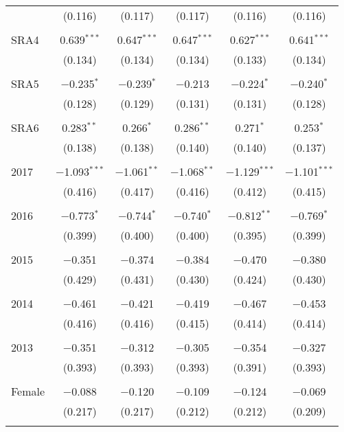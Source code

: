 \begin{table}[H]
\begin{adjustbox}{width=\textwidth, totalheight=\baselineskip}
\begin{tabular}{@{\extracolsep{5pt}}lccccc}
  & (0.116) & (0.117) & (0.117) & (0.116) & (0.116) \\ 
  & & & & & \\ 
 SRA4 & 0.639$^{***}$ & 0.647$^{***}$ & 0.647$^{***}$ & 0.627$^{***}$ & 0.641$^{***}$ \\ 
  & (0.134) & (0.134) & (0.134) & (0.133) & (0.134) \\ 
  & & & & & \\ 
 SRA5 & $-$0.235$^{*}$ & $-$0.239$^{*}$ & $-$0.213 & $-$0.224$^{*}$ & $-$0.240$^{*}$ \\ 
  & (0.128) & (0.129) & (0.131) & (0.131) & (0.128) \\ 
  & & & & & \\ 
 SRA6 & 0.283$^{**}$ & 0.266$^{*}$ & 0.286$^{**}$ & 0.271$^{*}$ & 0.253$^{*}$ \\ 
  & (0.138) & (0.138) & (0.140) & (0.140) & (0.137) \\ 
  & & & & & \\ 
 2017 & $-$1.093$^{***}$ & $-$1.061$^{**}$ & $-$1.068$^{**}$ & $-$1.129$^{***}$ & $-$1.101$^{***}$ \\ 
  & (0.416) & (0.417) & (0.416) & (0.412) & (0.415) \\ 
  & & & & & \\ 
 2016 & $-$0.773$^{*}$ & $-$0.744$^{*}$ & $-$0.740$^{*}$ & $-$0.812$^{**}$ & $-$0.769$^{*}$ \\ 
  & (0.399) & (0.400) & (0.400) & (0.395) & (0.399) \\ 
  & & & & & \\ 
 2015 & $-$0.351 & $-$0.374 & $-$0.384 & $-$0.470 & $-$0.380 \\ 
  & (0.429) & (0.431) & (0.430) & (0.424) & (0.430) \\ 
  & & & & & \\ 
 2014 & $-$0.461 & $-$0.421 & $-$0.419 & $-$0.467 & $-$0.453 \\ 
  & (0.416) & (0.416) & (0.415) & (0.414) & (0.414) \\ 
  & & & & & \\ 
 2013 & $-$0.351 & $-$0.312 & $-$0.305 & $-$0.354 & $-$0.327 \\ 
  & (0.393) & (0.393) & (0.393) & (0.391) & (0.393) \\ 
  & & & & & \\ 
 Female & $-$0.088 & $-$0.120 & $-$0.109 & $-$0.124 & $-$0.069 \\ 
  & (0.217) & (0.217) & (0.212) & (0.212) & (0.209) \\ 
  & & & & & \\ 

\end{tabular}
\end{adjustbox}
\end{table}
